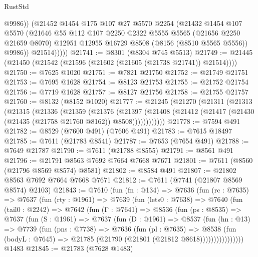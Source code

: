 \begin{lexlean}{RustStd}
\begin{coremodule}
{\begin{coremodule}
{{{{{{{{{{{{{{{{{{{{{{{{{{{{{{{{{{                @9986))
            (@21452
              @1454
              @175
              @107
              @27
              @5570
              @2254
              (@21432
                @1454
                @107
                @5570
                (@21646
                  @55
                  @112
                  @107
                  @2250
                  @2322
                  @5555
                  @5565
                  (@21656 @2250 @21659 @8070)
                  @12951
                  @12955
                  @16729
                  @8508
                  (@8156 (@8510 @5565 @5556))
                  @9986))
              @21514)))))
@21741 := @8301 (@8304 @745 @5513)
@21749 := @21445 (@21450 (@21542 (@21596 (@21602 (@21605 (@21738 @21741)) @21514))))
@21750 := @7625 @1020
@21751 := @7821 @21750
@21752 := @21749 @21751
@21753 := @7695 @1628
@21754 := @8123 @21753
@21755 := @21752 @21754
@21756 := @7719 @1628
@21757 := @8127 @21756
@21758 := @21755 @21757
@21760 := @8132 (@8152 @1020)
@21777 := @21245
    (@21270
      (@21311
        (@21313
          (@21315
            (@21336
              (@21359
                (@21376
                  (@21397
                    (@21408 (@21412 (@21417 (@21430 (@21435 (@21758 @21760 @8162)) @8508))))))))))))
@21778 := @7594 @491
@21782 := @8529 (@7600 @491) (@7606 @491)
@21783 := @7615 @18497
@21785 := @7611 (@21783 @8541)
@21787 := @7653 (@7654 @491)
@21788 := @7649 @21787
@21790 := @7611 (@21788 @8555)
@21791 := @8561 @491
@21796 := @21791 @8563 @7692 @7664 @7668 @7671
@21801 := @7611 (@8560 (@21796 @8569 @8574) @8581)
@21802 := @8584 @491
@21807 := @21802 @8563 @7692 @7664 @7668 @7671
@21812 := @7611 (@7741 (@21807 @8569 @8574) @2103)
@21843 := @7610
    (fun (fn : @134) =>
    @7636
      (fun (rc : @7635) =>
      @7637
        (fun (rty : @1961) =>
        @7639
          (fun (lets0 : @7638) =>
          @7640
            (fun (tail0 : @2242) =>
            @7642
              (fun (Γ : @7641) =>
              @8536
                (fun (ps : @8535) =>
                @7637
                  (fun (S : @1961) =>
                  @7637
                    (fun (D : @1961) =>
                    @8537
                      (fun (hn : @13) =>
                      @7739
                        (fun (pns : @7738) =>
                        @7636
                          (fun (pl : @7635) =>
                          @8538
                            (fun (bodyL : @7645) =>
                            @21785 (@21790 (@21801 (@21812 @8618))))))))))))))))
    @1483
@21845 := @21783 (@7628 @1483)
}}}}}}}}}}}}}}}}}}}}}}}}}}}}}}}}}}
\end{coremodule}}
\end{coremodule}
\end{lexlean}
